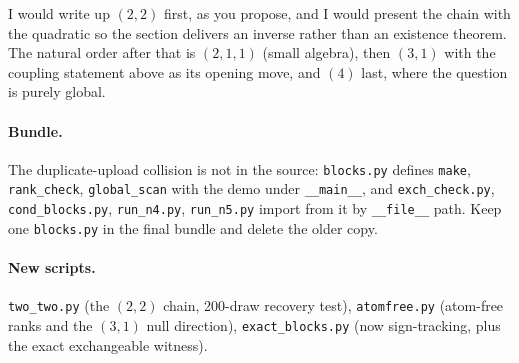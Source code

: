 \documentclass[11pt]{article}
\theoremstyle{remark}
\begin{document}
I would write up $(2,2)$ first, as you propose, and I would present the chain with the quadratic so the section delivers an inverse rather than an existence theorem. The natural order after that is $(2,1,1)$ (small algebra), then $(3,1)$ with the coupling statement above as its opening move, and $(4)$ last, where the question is purely global.

\paragraph{Bundle.} The duplicate-upload collision is not in the source: \texttt{blocks.py} defines \texttt{make}, \texttt{rank\_check}, \texttt{global\_scan} with the demo under \texttt{\_\_main\_\_}, and \texttt{exch\_check.py}, \texttt{cond\_blocks.py}, \texttt{run\_n4.py}, \texttt{run\_n5.py} import from it by \texttt{\_\_file\_\_} path. Keep one \texttt{blocks.py} in the final bundle and delete the older copy.

\paragraph{New scripts.} \texttt{two\_two.py} (the $(2,2)$ chain, 200-draw recovery test), \texttt{atomfree.py} (atom-free ranks and the $(3,1)$ null direction), \texttt{exact\_blocks.py} (now sign-tracking, plus the exact exchangeable witness).
\end{document}
